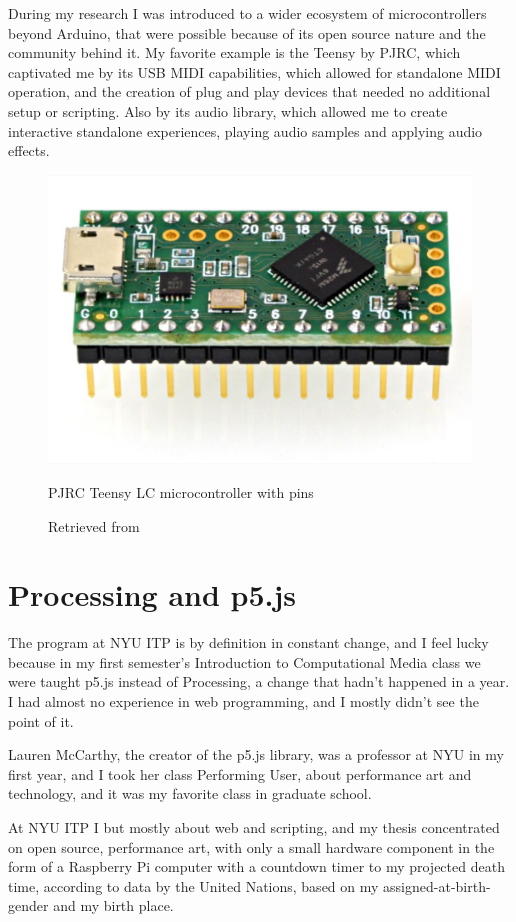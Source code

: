 During my research I was introduced to a wider ecosystem of microcontrollers beyond Arduino, that were possible because of its open source nature and the community behind it. My favorite example is the Teensy by PJRC, which captivated me by its USB MIDI capabilities, which allowed for standalone \acrshort{MIDI} operation, and the creation of plug and play devices that needed no additional setup or scripting. Also by its audio library, which allowed me to create interactive standalone experiences, playing audio samples and applying audio effects.

\begin{figure}[ht]
  \centering
  \includegraphics[width=0.75\linewidth,height=0.25\textheight,keepaspectratio]{images/pjrc-teensy-lc-with-pins.jpg}
  \caption{PJRC Teensy LC microcontroller with pins}
  \caption*{Retrieved from \cite{website-pjrc-teensy-lc-with-pins}}
  \label{fig:pjrc-teensy-lc-with-pins}
\end{figure}

\section{Processing and p5.js}

The program at \acrshort{NYU} \acrshort{ITP} is by definition in constant change, and I feel lucky because in my first semester's Introduction to Computational Media class we were taught p5.js instead of Processing, a change that hadn't happened in a year. I had almost no experience in web programming, and I mostly didn't see the point of it.

Lauren McCarthy, the creator of the p5.js library, was a professor at \acrshort{NYU} in my first year, and I took her class Performing User, about performance art and technology, and it was my favorite class in graduate school.

At \acrshort{NYU} \acrshort{ITP} I but mostly about web and scripting, and my thesis concentrated on open source, performance art, with only a small hardware component in the form of a Raspberry Pi computer with a countdown timer to my projected death time, according to data by the United Nations, based on my assigned-at-birth-gender and my birth place.

